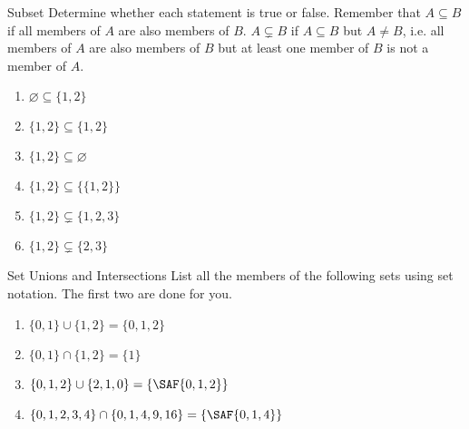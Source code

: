 \documentclass[12pt,letterpaper]{article}
\begin{document}
\begin{problem}{Subset}
  Determine whether each statement is true or false. Remember that $A \subseteq B$ if all
  members of $A$ are also members of $B$. $A \subsetneq B$ if $A \subseteq B$ but $A \ne B$,
  i.e. all members of $A$ are also members of $B$ but at least one member of $B$ is not a
  member of $A$.

  \begin{multicols}{2}
  \begin{enumerate}[\hspace{.5cm}a.]
    \item \( \varnothing \subseteq \{1, 2\} \) \hfill \TFTrue
    \item \( \{1, 2\} \subseteq \{1, 2\} \) \hfill \TFTrue
    \item \( \{1, 2\} \subseteq \varnothing \) \hfill \TFFalse
    \item \( \{1, 2\} \subseteq \{\{1, 2\}\} \) \hfill \TFFalse
    \item \( \{1, 2\} \subsetneq \{1, 2, 3\} \) \hfill \TFTrue
    \item \( \{1, 2\} \subsetneq \{2, 3\} \) \hfill \TFFalse
  \end{enumerate}
  \end{multicols}
\end{problem}

\begin{problem}{Set Unions and Intersections}
  List all the members of the following sets using set notation. The first two are done for
  you.

  \begin{enumerate}[\hspace{.5cm}a.]
    \item \( \{0, 1\} \cup \{1, 2\} = \{0, 1, 2\} \)
    \item \( \{0, 1\} \cap \{1, 2\} = \{1\} \)
    \item \( \{0, 1, 2\} \cup \{2, 1, 0\} = \{\SAF{0, 1, 2}\} \)
    \item \( \{0, 1, 2, 3, 4\} \cap \{0, 1, 4, 9, 16\} = \{\SAF{0, 1, 4}\} \)
  \end{enumerate}
\end{problem}
\end{document}
